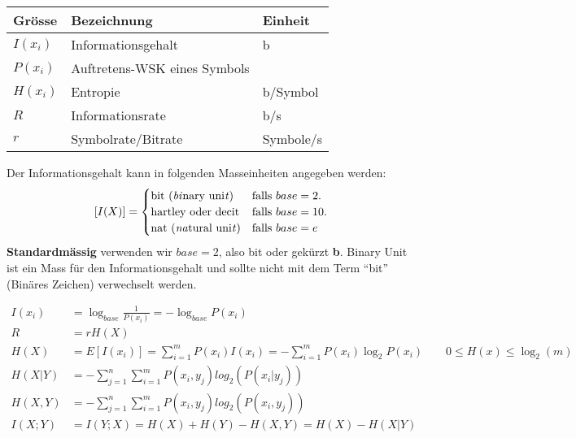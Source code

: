 \begin{multicols}{2}
\renewcommand{\arraystretch}{\arraystretchOriginal}
\begin{tabular}{|l|l|l|}
	\hline
	\textbf{Grösse}	& \textbf{Bezeichnung}	& \textbf{Einheit} \\ 
	\hline
	$I(x_i)$ 	& Informationsgehalt 	& b \\
	\hline
	$P(x_i)$	& Auftretens-WSK eines Symbols & \\
	\hline
	$H(x_i)$	& Entropie				& b/Symbol\\
	\hline
	$R$			& Informationsrate 		& b/s \\
	\hline
	$r$			& Symbolrate/Bitrate	& Symbole/s	 \\
	\hline
\end{tabular}

Der Informationsgehalt kann in folgenden Masseinheiten angegeben werden:
\[ [I(X)] = \begin{cases}
            	\text{bit (\emph{bi}nary uni\emph{t})} 
            		& \text{falls } base=2. \\
            	\text{hartley oder decit}
            		& \text{falls } base=10. \\
            	\text{nat (\emph{na}tural uni\emph{t})} 
            		& \text{falls } base=e
			\end{cases} 
\]
\textbf{Standardmässig} verwenden wir $base=2$, also bit oder gekürzt
\textbf{b}. Binary Unit ist ein Mass für den Informationsgehalt und sollte nicht mit dem Term ``bit'' (Binäres Zeichen) verwechselt
werden.
\end{multicols}

\begin{align*}
	I(x_i)	&= \log_{base} \frac{1}{P(x_i)} = - \log_{base} P(x_i) \\
	R		&= r H (X) \\
	H(X)	&= E[I(x_i)] = \sum\limits_{i=1}^m P(x_i) I(x_i) = - \sum\limits_{i=1}^m P(x_i) \log_2{P(x_i)} \qquad 0 \leq H(x) \leq \log_2(m) \\
	H(X|Y)	&=- \sum\limits_{j=1}^{n} \sum\limits_{i=1}^{m} P(x_i,y_j) log_2(P(x_i|y_j)) \\
	H(X,Y)	&=- \sum\limits_{j=1}^{n} \sum\limits_{i=1}^{m} P(x_i,y_j) log_2(P(x_i,y_j)) \\
	I(X;Y)	&=I(Y;X)=H(X)+H(Y)-H(X,Y)=H(X)-H(X|Y) 
\end{align*}


